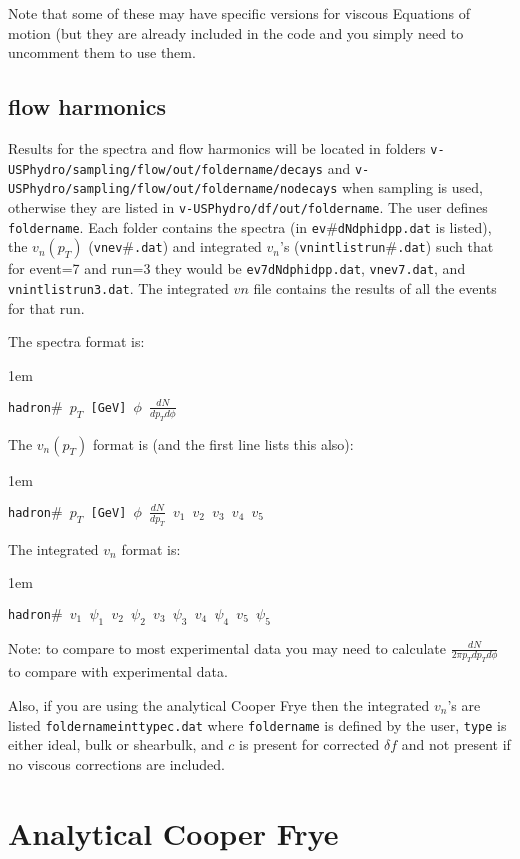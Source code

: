 \documentclass[article]{revtex4-1}
\newcommand{\code}[1]{\bigskip\noindent\begin{addmargin}[3em]{1em}\begin{linenumbers}\texttt{#1}\end{linenumbers}\end{addmargin}\bigskip}
\newcommand{\nocode}[1]{\texttt{#1}}
\begin{document}
Note that some of these may have specific versions for viscous Equations of motion (but they are already included in the code and you simply need to uncomment them to use them.

\subsection{flow harmonics}

Results for the spectra and flow harmonics will be located in folders \nocode{v-USPhydro/sampling/flow/out/foldername/decays} and \nocode{v-USPhydro/sampling/flow/out/foldername/nodecays} when sampling is used, otherwise they are listed in \nocode{v-USPhydro/df/out/foldername}. The user defines \nocode{foldername}.  Each folder contains  the spectra (in \nocode{ev$\#$\textunderscore dNdphidpp.dat} is listed), the $v_n(p_T)$ (\nocode{vn\textunderscore ev$\#$.dat}) and integrated $v_n$'s (\nocode{vnintlistrun$\#$.dat}) such that for event=7 and run=3 they would be   \nocode{ev7\textunderscore dNdphidpp.dat}, \nocode{vn\textunderscore ev7.dat}, and \nocode{vnintlistrun3.dat}.  The integrated $vn$ file contains the results of all the events for that run. 

The spectra format is:

\code{hadron$\#$ $p_T$ [GeV] $\phi$ $\frac{dN}{dp_Td\phi}$}

The $v_n(p_T)$ format is (and the first line lists this also):

\code{hadron$\#$ $p_T$ [GeV] $\phi$ $\frac{dN}{dp_T}$ $v_1$ $v_2$ $v_3$ $v_4$ $v_5$ }

The integrated $v_n$ format is:

\code{hadron$\#$  $v_1$ $\psi_1$ $v_2$ $\psi_2$ $v_3$ $\psi_3$ $v_4$ $\psi_4$ $v_5$ $\psi_5$ }


Note: to compare to most experimental data you may need to calculate $\frac{dN}{2\pi p_T dp_Td\phi}$ to compare with experimental data.

Also, if you are using the analytical Cooper Frye then the integrated $v_n$'s are listed \nocode{foldernameint\textunderscore typec.dat} where \nocode{foldername} is defined by the user, \nocode{type} is either ideal, bulk or shearbulk, and $c$ is present for corrected $\delta f$ and not present if no viscous corrections are included.

\section{Analytical Cooper Frye}\label{sec:acf}
\end{document}
